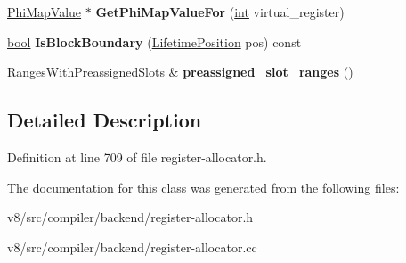 \begin{DoxyCompactItemize}
\item 
\mbox{\label{classv8_1_1internal_1_1compiler_1_1RegisterAllocationData_a0d52d71a36565e0ff19921fe5fda463d}} 
\mbox{\hyperlink{classv8_1_1internal_1_1compiler_1_1RegisterAllocationData_1_1PhiMapValue}{Phi\+Map\+Value}} $\ast$ {\bfseries Get\+Phi\+Map\+Value\+For} (\mbox{\hyperlink{classint}{int}} virtual\+\_\+register)
\item 
\mbox{\label{classv8_1_1internal_1_1compiler_1_1RegisterAllocationData_a6f8fcd07e74378d83027c2d1fb5c491d}} 
\mbox{\hyperlink{classbool}{bool}} {\bfseries Is\+Block\+Boundary} (\mbox{\hyperlink{classv8_1_1internal_1_1compiler_1_1LifetimePosition}{Lifetime\+Position}} pos) const
\item 
\mbox{\label{classv8_1_1internal_1_1compiler_1_1RegisterAllocationData_ae5e91e376daf933766242d3cb7441581}} 
\mbox{\hyperlink{classv8_1_1internal_1_1ZoneVector}{Ranges\+With\+Preassigned\+Slots}} \& {\bfseries preassigned\+\_\+slot\+\_\+ranges} ()
\end{DoxyCompactItemize}


\subsection{Detailed Description}


Definition at line 709 of file register-\/allocator.\+h.



The documentation for this class was generated from the following files\+:\begin{DoxyCompactItemize}
\item 
v8/src/compiler/backend/register-\/allocator.\+h\item 
v8/src/compiler/backend/register-\/allocator.\+cc\end{DoxyCompactItemize}
